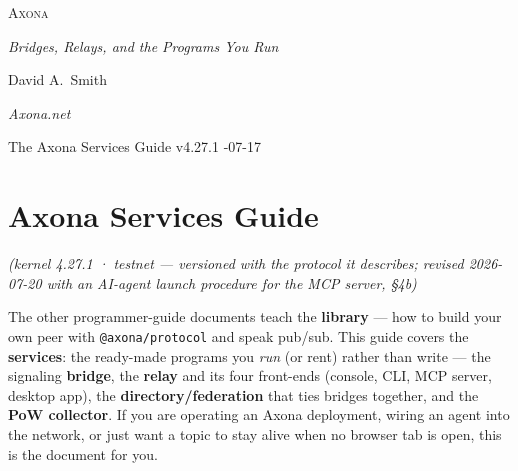 \documentclass[
  nobib]{tufte-handout}
\author{}
\date{}
\begin{document}
\thispagestyle{empty}
\null\vfill
\begin{center}
{\fontsize{48}{52}\selectfont \textsc{Axona}\par}
\vspace{0.6em}
{\Large\itshape Bridges, Relays, and the Programs You Run\par}
\vspace{4em}
{\large David A.~Smith\par}
{\itshape\small Axona.net\par}
\vspace{2em}
{\small The Axona Services Guide \quad v4.27.1 -07-17\par}
\end{center}
\vfill
\null
\newpage
\pagestyle{ndhtplain}
\thispagestyle{ndhtplain}
\setcounter{page}{1}

\section{Axona Services Guide}\label{axona-services-guide}

\emph{(kernel 4.27.1 · testnet --- versioned with the protocol it
describes; revised 2026-07-20 with an AI-agent launch procedure for the
MCP server, §4b)}

The other programmer-guide documents teach the \textbf{library} --- how
to build your own peer with \texttt{@axona/protocol} and speak pub/sub.
This guide covers the \textbf{services}: the ready-made programs you
\emph{run} (or rent) rather than write --- the signaling
\textbf{bridge}, the \textbf{relay} and its four front-ends (console,
CLI, MCP server, desktop app), the \textbf{directory/federation} that
ties bridges together, and the \textbf{PoW collector}. If you are
operating an Axona deployment, wiring an agent into the network, or just
want a topic to stay alive when no browser tab is open, this is the
document for you.
\end{document}
